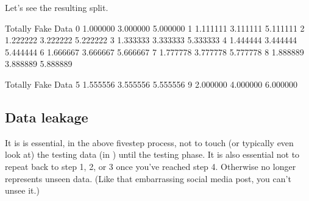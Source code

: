 \documentclass[letterpaper,10pt,english]{jupyterBook}
\begin{document}
\begin{sphinxVerbatim}[commandchars=\\\{\}]
      
    
  \PYG{p}{[}\PYG{p}{]}
  \PYG{p}{[}\PYG{p}{]}
\end{sphinxVerbatim}

\sphinxAtStartPar
Let’s see the resulting split.

\begin{sphinxVerbatim}[commandchars=\\\{\}]
\end{sphinxVerbatim}

\begin{sphinxVerbatim}[commandchars=\\\{\}]
    Totally      Fake      Data
0  1.000000  3.000000  5.000000
1  1.111111  3.111111  5.111111
2  1.222222  3.222222  5.222222
3  1.333333  3.333333  5.333333
4  1.444444  3.444444  5.444444
6  1.666667  3.666667  5.666667
7  1.777778  3.777778  5.777778
8  1.888889  3.888889  5.888889
\end{sphinxVerbatim}

\begin{sphinxVerbatim}[commandchars=\\\{\}]
\end{sphinxVerbatim}

\begin{sphinxVerbatim}[commandchars=\\\{\}]
    Totally      Fake      Data
5  1.555556  3.555556  5.555556
9  2.000000  4.000000  6.000000
\end{sphinxVerbatim}


\subsection{Data leakage}
\label{\detokenize{chapter-17-machine-learning:data-leakage}}
\sphinxAtStartPar
It is is essential, in the above five\sphinxhyphen{}step process, not to touch (or typically even look at) the testing data (in ) until the testing phase.  It is also essential not to repeat back to step 1, 2, or 3 once you’ve reached step 4.  Otherwise  no longer represents unseen data.  (Like that embarrassing social media post, you can’t unsee it.)
\end{document}
